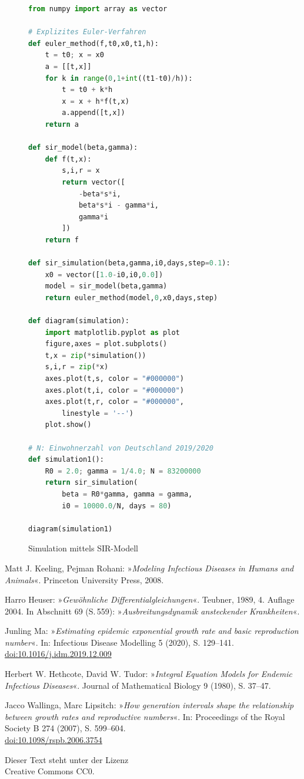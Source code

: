 \documentclass[a4paper,10pt,fleqn,twocolumn,twoside,dvipdfmx]{scrartcl}
\numberwithin{equation}{section}
\begin{document}
\begin{figure}[h!]
\begin{lstlisting}[language=Python]
from numpy import array as vector

# Explizites Euler-Verfahren
def euler_method(f,t0,x0,t1,h):
    t = t0; x = x0
    a = [[t,x]]
    for k in range(0,1+int((t1-t0)/h)):
        t = t0 + k*h
        x = x + h*f(t,x)
        a.append([t,x])
    return a

def sir_model(beta,gamma):
    def f(t,x):
        s,i,r = x
        return vector([
            -beta*s*i,
            beta*s*i - gamma*i,
            gamma*i
        ])
    return f

def sir_simulation(beta,gamma,i0,days,step=0.1):
    x0 = vector([1.0-i0,i0,0.0])
    model = sir_model(beta,gamma)
    return euler_method(model,0,x0,days,step)

def diagram(simulation):
    import matplotlib.pyplot as plot
    figure,axes = plot.subplots()
    t,x = zip(*simulation())
    s,i,r = zip(*x)
    axes.plot(t,s, color = "#000000")
    axes.plot(t,i, color = "#000000")
    axes.plot(t,r, color = "#000000",
        linestyle = '--')
    plot.show()

# N: Einwohnerzahl von Deutschland 2019/2020
def simulation1():
    R0 = 2.0; gamma = 1/4.0; N = 83200000
    return sir_simulation(
        beta = R0*gamma, gamma = gamma,
        i0 = 10000.0/N, days = 80)

diagram(simulation1)
\end{lstlisting}
\caption{Simulation mittels SIR-Modell}
\end{figure}

\newpage
\begin{thebibliography}{00}
 Matt J. Keeling, Pejman Rohani:
»\emph{Modeling Infectious Diseases in Humans and Animals}«.
Princeton University Press, 2008.

 Harro Heuser: »\emph{Gewöhnliche Differentialgleichungen}«.
Teubner, 1989, 4. Auflage 2004. In Abschnitt 69 (S.\,559):
»\emph{Ausbreitungsdynamik ansteckender Krankheiten}«.

 Junling Ma: »\emph{Estimating epidemic exponential growth
rate and basic reproduction number}«. In: Infectious Disease Modelling 5
(2020), S. 129--141.\\
\href{https://doi.org/10.1016/j.idm.2019.12.009}%
{doi:10.1016/j.idm.2019.12.009}

 Herbert W. Hethcote, David W. Tudor:
»\emph{Integral Equation Models for Endemic Infectious Diseases}«.
Journal of Mathematical Biology 9 (1980), S. 37--47.

 Jacco Wallinga, Marc Lipsitch:
»\emph{How generation intervals shape the relationship
between growth rates and reproductive numbers}«.
In: Proceedings of the Royal Society B 274 (2007), S. 599--604.\\
\href{https://doi.org/10.1098/rspb.2006.3754}{doi:10.1098/rspb.2006.3754}
\end{thebibliography}
\vfill

\noindent
{\small Dieser Text steht unter der Lizenz\\
Creative Commons CC0.}
\end{document}
